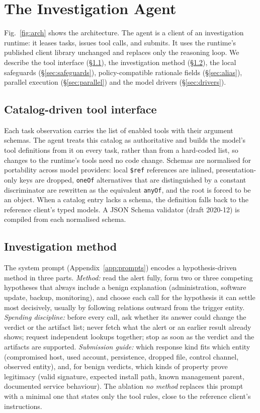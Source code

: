 \section{The Investigation Agent}
\label{sec:method}

Fig.~\ref{fig:arch} shows the architecture. The agent is a client of an investigation runtime: it leases
tasks, issues tool calls, and submits. It uses the runtime's published client library unchanged and replaces
only the reasoning loop. We describe the tool interface (\S\ref{sec:catalog}), the investigation method
(\S\ref{sec:prompt}), the local safeguards (\S\ref{sec:safeguards}), policy-compatible rationale fields
(\S\ref{sec:alias}), parallel execution (\S\ref{sec:parallel}) and the model drivers (\S\ref{sec:drivers}).



\subsection{Catalog-driven tool interface}
\label{sec:catalog}
Each task observation carries the list of enabled tools with their argument schemas. The agent treats this
catalog as authoritative and builds the model's tool definitions from it on every task, rather than from a
hard-coded list, so changes to the runtime's tools need no code change. Schemas are normalised for portability
across model providers: local \texttt{\$ref} references are inlined, presentation-only keys are dropped,
\texttt{oneOf} alternatives that are distinguished by a constant discriminator are rewritten as the equivalent
\texttt{anyOf}, and the root is forced to be an object. When a catalog entry lacks a schema, the definition
falls back to the reference client's typed models. A JSON Schema validator (draft 2020-12) is compiled from
each normalised schema.

\subsection{Investigation method}
\label{sec:prompt}
The system prompt (Appendix~\ref{app:prompts}) encodes a hypothesis-driven method in three parts.
\emph{Method:} read the alert fully, form two or three competing hypotheses that always include a benign
explanation (administration, software update, backup, monitoring), and choose each call for the hypothesis it
can settle most decisively, usually by following relations outward from the trigger entity.
\emph{Spending discipline:} before every call, ask whether its answer could change the verdict or the artifact
list; never fetch what the alert or an earlier result already shows; request independent lookups together;
stop as soon as the verdict and the artifacts are supported. \emph{Submission guide:} which response kind fits
which entity (compromised host, used account, persistence, dropped file, control channel, observed entity),
and, for benign verdicts, which kinds of property prove legitimacy (valid signature, expected install path,
known management parent, documented service behaviour). The ablation \emph{no method} replaces this prompt
with a minimal one that states only the tool rules, close to the reference client's instructions.

